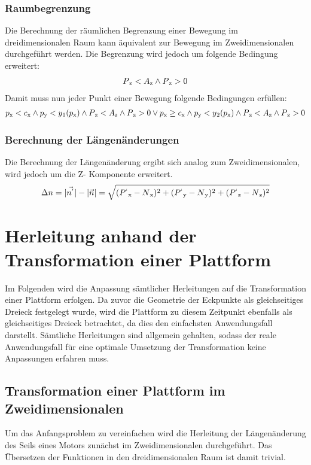 \documentclass[a4paper, 12pt]{article}
\begin{document}
			\subsubsection{Raumbegrenzung}
			Die Berechnung der räumlichen Begrenzung einer Bewegung im dreidimensionalen Raum kann äquivalent zur Bewegung im Zweidimensionalen durchgeführt werden. Die Begrenzung wird jedoch um folgende Bedingung erweitert:
			\begin{align}
			P\textsubscript{z}<A\textsubscript{z}\land P\textsubscript{z}>0
			\end{align}
			Damit muss nun jeder Punkt einer Bewegung folgende Bedingungen erfüllen:
			\begin{align}
			p\textsubscript{x}<c\textsubscript{x} 
			\land 	p\textsubscript{y}<y\textsubscript{1}(p\textsubscript{x})
			\land	P\textsubscript{z}<A\textsubscript{z}
			\land 	P\textsubscript{z}>0 
			\lor
			p\textsubscript{x} \geq c\textsubscript{x} 
			\land 	p\textsubscript{y}<y\textsubscript{2}(p\textsubscript{x})
			\land	P\textsubscript{z}<A\textsubscript{z}
			\land 	P\textsubscript{z}>0
			\end{align}
			\subsubsection{Berechnung der Längenänderungen}
			Die Berechnung der Längenänderung ergibt sich analog zum Zweidimensionalen, wird jedoch um die Z- Komponente erweitert.
			\begin{align}
			\Delta n =
			|\vec{n^{'}}|-|\vec{n}|=
			\sqrt{
				(P^{`}\textsubscript{x}-N\textsubscript{x})^2+
				(P^{`}\textsubscript{y}-N\textsubscript{y})^2+
				(P^{`}\textsubscript{z}-N\textsubscript{z})^2
			}
			\end{align}	
			\pagebreak
	\section{Herleitung anhand der Transformation einer Plattform}
	Im Folgenden wird die Anpassung sämtlicher Herleitungen auf die Transformation einer Plattform erfolgen. Da zuvor die Geometrie der Eckpunkte als gleichseitiges Dreieck festgelegt wurde, wird die Plattform zu diesem Zeitpunkt ebenfalls als gleichseitiges Dreieck betrachtet, da dies den einfachsten Anwendungsfall darstellt. Sämtliche Herleitungen sind allgemein gehalten, sodass der reale Anwendungsfall für eine optimale Umsetzung der Transformation keine Anpassungen erfahren muss.
	\subsection{Transformation einer Plattform im Zweidimensionalen}
	Um das Anfangsproblem zu vereinfachen wird die Herleitung der Längenänderung des Seils eines Motors zunächst im Zweidimensionalen durchgeführt. Das Übersetzen der Funktionen in den dreidimensionalen Raum ist damit trivial.
	\pagebreak
\end{document}
